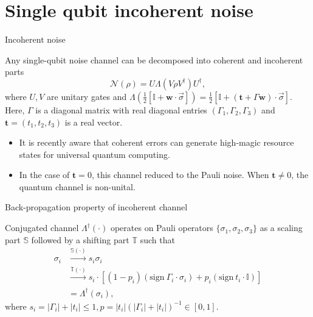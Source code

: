 \documentclass{beamer}
\begin{document}
\section{Single qubit incoherent noise}

\begin{frame}{Incoherent noise }
    \begin{lemma}
    Any single-qubit noise channel can be decomposed into coherent and incoherent parts
\[
\mathcal{N}(\rho) = U \Lambda(V \rho V^\dagger)U^\dagger,
\]
where $U,V$ are unitary gates and  \(\Lambda\left(\frac{1}{2}[\mathbb{I} + \mathbf{w} \cdot \vec \sigma]\right) = \frac{1}{2}[\mathbb{I} + (\mathbf{t} + \Gamma\mathbf{w}) \cdot  \vec\sigma]\). Here, \(\Gamma\) is a diagonal matrix with real diagonal entries $(\Gamma_1,\Gamma_2,\Gamma_3)$ and $\mathbf{t} = (t_1,t_2,t_3)$ is a real vector. 
\end{lemma}
\begin{itemize}
    \item It is recently aware that coherent errors can generate high-magic resource states for universal quantum computing. ~\cite{niroula2024phase,turkeshi2024coherent}
    \item In the case of $\mathbf{t} = 0$, this channel reduced to the Pauli noise. When \(\mathbf{t} \neq 0\), the quantum channel is non-unital.
\end{itemize}
\end{frame}

\begin{frame}{Back-propagation property of incoherent channel}
    \begin{theorem}\label{theo:non-unital_back-propagation}
Conjugated channel $\Lambda^\dagger(\cdot)$ operates on Pauli operators  $\{\sigma_1,\sigma_2,\sigma_3\}$ as a scaling part $\mathbb{S}$ followed by a shifting part $\mathbb{T}$ such that
   \begin{align}
       \sigma_i &\xrightarrow{\mathbb{S}(\cdot)} s_i \sigma_i\\
       &\xrightarrow{\mathbb{T}(\cdot)} s_i\cdot \left[(1 - p_i)(\text{sign}~\Gamma_i \cdot \sigma_i) + p_i(\text{sign}~t_i\cdot\mathbb{I})\right]\\
       &= \Lambda^\dagger(\sigma_i),
   \end{align}
   where $s_i = |\Gamma_i| + |t_i| \leq 1, p = {|t_i|}{(|\Gamma_i| + |t_i|)}^{-1} \in [0,1]$. 
\end{theorem}
\end{frame}
\end{document}

